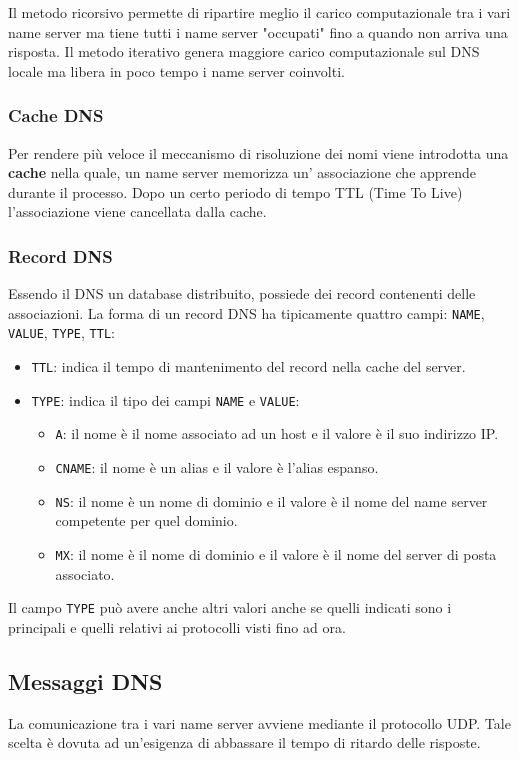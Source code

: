 Il metodo ricorsivo permette di ripartire meglio il carico 
computazionale tra i vari name server ma tiene tutti i name server 
"occupati" fino a quando non arriva una risposta. Il metodo iterativo
genera maggiore carico computazionale sul DNS locale ma libera in poco 
tempo i name server coinvolti.

\subsubsection{Cache DNS}
Per rendere più veloce il meccanismo di risoluzione dei nomi viene 
introdotta una \textbf{cache} nella quale, un name server memorizza un'
associazione che apprende durante il processo. Dopo un certo periodo di
tempo TTL (Time To Live) l'associazione viene cancellata dalla cache.

\subsubsection{Record DNS}
Essendo il DNS un database distribuito, possiede dei record contenenti 
delle associazioni. La forma di un record DNS ha tipicamente quattro 
campi: \verb|NAME|, \verb|VALUE|, \verb|TYPE|, \verb|TTL|:
\begin{itemize}
	\item \verb|TTL|: indica il tempo di mantenimento del record nella 
		cache del server.
	\item \verb|TYPE|: indica il tipo dei campi \verb|NAME| e 
		\verb|VALUE|:
	      \begin{itemize}
		      \item \verb|A|: il nome è il nome associato ad un host 
				  e il valore è il suo indirizzo IP.
		      \item \verb|CNAME|: il nome è un alias e il valore è 
				  l'alias espanso.
		      \item \verb|NS|: il nome è un nome di dominio e il valore
				  è il nome del name server competente per quel 
				  dominio.
		      \item \verb|MX|: il nome è il nome di dominio e il valore
				  è il nome del server di posta associato.
	      \end{itemize}
\end{itemize}
Il campo \verb|TYPE| può avere anche altri valori anche se quelli
indicati sono i principali e quelli relativi ai protocolli visti fino 
ad ora.

\subsection{Messaggi DNS}
La comunicazione tra i vari name server avviene mediante il protocollo 
UDP. Tale scelta è dovuta ad un'esigenza di abbassare il tempo di
ritardo delle risposte.


